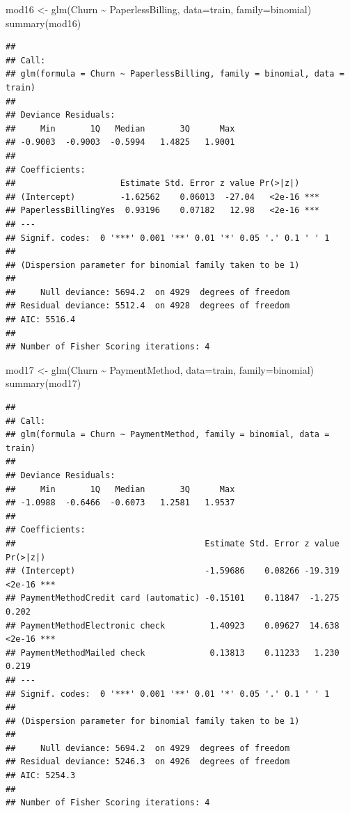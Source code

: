 \documentclass[
  twoside]{article}
\newenvironment{Shaded}{\begin{snugshade}}{\end{snugshade}}
\newcommand{\AttributeTok}[1]{\textcolor[rgb]{0.77,0.63,0.00}{#1}}
\newcommand{\FunctionTok}[1]{\textcolor[rgb]{0.00,0.00,0.00}{#1}}
\newcommand{\NormalTok}[1]{#1}
\newcommand{\OtherTok}[1]{\textcolor[rgb]{0.56,0.35,0.01}{#1}}
\newcommand{\SpecialCharTok}[1]{\textcolor[rgb]{0.00,0.00,0.00}{#1}}
\begin{document}
\begin{Shaded}
\begin{Highlighting}[]
\NormalTok{mod16 }\OtherTok{\textless{}{-}} \FunctionTok{glm}\NormalTok{(Churn }\SpecialCharTok{\textasciitilde{}}\NormalTok{ PaperlessBilling, }\AttributeTok{data=}\NormalTok{train, }\AttributeTok{family=}\NormalTok{binomial)}
\FunctionTok{summary}\NormalTok{(mod16)}
\end{Highlighting}
\end{Shaded}

\begin{verbatim}
## 
## Call:
## glm(formula = Churn ~ PaperlessBilling, family = binomial, data = train)
## 
## Deviance Residuals: 
##     Min       1Q   Median       3Q      Max  
## -0.9003  -0.9003  -0.5994   1.4825   1.9001  
## 
## Coefficients:
##                     Estimate Std. Error z value Pr(>|z|)    
## (Intercept)         -1.62562    0.06013  -27.04   <2e-16 ***
## PaperlessBillingYes  0.93196    0.07182   12.98   <2e-16 ***
## ---
## Signif. codes:  0 '***' 0.001 '**' 0.01 '*' 0.05 '.' 0.1 ' ' 1
## 
## (Dispersion parameter for binomial family taken to be 1)
## 
##     Null deviance: 5694.2  on 4929  degrees of freedom
## Residual deviance: 5512.4  on 4928  degrees of freedom
## AIC: 5516.4
## 
## Number of Fisher Scoring iterations: 4
\end{verbatim}

\begin{Shaded}
\begin{Highlighting}[]
\NormalTok{mod17 }\OtherTok{\textless{}{-}} \FunctionTok{glm}\NormalTok{(Churn }\SpecialCharTok{\textasciitilde{}}\NormalTok{ PaymentMethod, }\AttributeTok{data=}\NormalTok{train, }\AttributeTok{family=}\NormalTok{binomial)}
\FunctionTok{summary}\NormalTok{(mod17)}
\end{Highlighting}
\end{Shaded}

\begin{verbatim}
## 
## Call:
## glm(formula = Churn ~ PaymentMethod, family = binomial, data = train)
## 
## Deviance Residuals: 
##     Min       1Q   Median       3Q      Max  
## -1.0988  -0.6466  -0.6073   1.2581   1.9537  
## 
## Coefficients:
##                                      Estimate Std. Error z value Pr(>|z|)    
## (Intercept)                          -1.59686    0.08266 -19.319   <2e-16 ***
## PaymentMethodCredit card (automatic) -0.15101    0.11847  -1.275    0.202    
## PaymentMethodElectronic check         1.40923    0.09627  14.638   <2e-16 ***
## PaymentMethodMailed check             0.13813    0.11233   1.230    0.219    
## ---
## Signif. codes:  0 '***' 0.001 '**' 0.01 '*' 0.05 '.' 0.1 ' ' 1
## 
## (Dispersion parameter for binomial family taken to be 1)
## 
##     Null deviance: 5694.2  on 4929  degrees of freedom
## Residual deviance: 5246.3  on 4926  degrees of freedom
## AIC: 5254.3
## 
## Number of Fisher Scoring iterations: 4
\end{verbatim}
\end{document}

